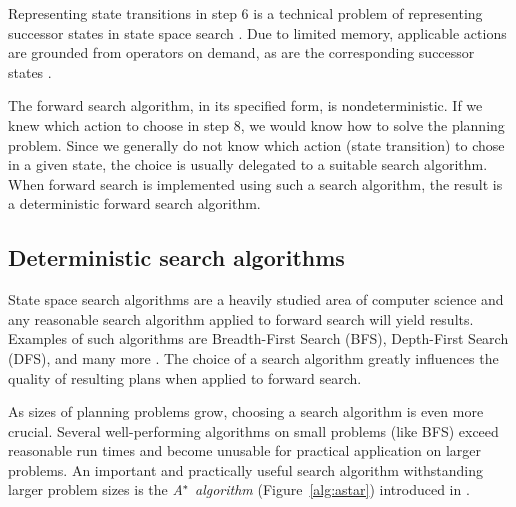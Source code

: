Representing state transitions in step 6
is a technical problem of representing successor states
in state space search \citep[Section~3.2]{Russell1995}.
Due to limited memory,
applicable actions are grounded from operators
on demand, as are the corresponding successor states
\citep[Section~3.4]{Russell1995}.

The forward search algorithm, in its specified form, is nondeterministic.
If we knew which action to choose in step 8,
we would know how to solve the planning problem.
Since we generally do not know which action (state transition) to chose in a given state, the choice is usually delegated to a suitable
search algorithm. When forward search is implemented using such a search algorithm, the result is a deterministic forward search algorithm.

\subsection{Deterministic search algorithms}

State space search algorithms are a heavily studied area
of computer science and any reasonable search algorithm applied
to forward search will yield results.
Examples of such algorithms are Breadth-First Search (BFS),
Depth-First Search (DFS), and many more \citep[Section~3.5]{Russell1995}.
The choice of a search algorithm greatly influences
the quality of resulting plans when applied to forward search.

As sizes of planning problems grow,
choosing a search algorithm is even more crucial.
Several well-performing algorithms on small problems (like BFS)
exceed reasonable run times and become unusable for practical application on larger problems.
An important and practically useful search algorithm
withstanding larger problem sizes is the \textit{A$^{\kern-.05em*}$ algorithm} (Figure~\ref{alg:astar})
introduced in \citet{Hart1968}.

